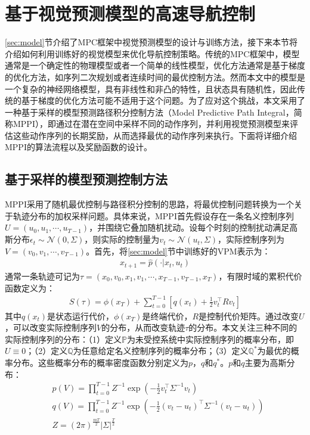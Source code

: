 \section{基于视觉预测模型的高速导航控制}
\ref{sec:model}节介绍了MPC框架中视觉预测模型的设计与训练方法，接下来本节将介绍如何利用训练好的视觉模型来优化导航控制策略。传统的MPC框架中，模型通常是一个确定性的物理模型或者一个简单的线性模型，优化方法通常是基于梯度的优化方法，如序列二次规划或者连续时间的最优控制方法。然而本文中的模型是一个复杂的神经网络模型，具有非线性和非凸的特性，且状态具有随机性，因此传统的基于梯度的优化方法可能不适用于这个问题。为了应对这个挑战，本文采用了一种基于采样的模型预测路径积分控制方法（Model Predictive Path Integral，简称MPPI）\cite{williams2017information, williams2018information}，即通过在潜在空间中采样不同的动作序列，并利用视觉预测模型来评估这些动作序列的长期奖励，从而选择最优的动作序列来执行。下面将详细介绍MPPI的算法流程以及奖励函数的设计。

\subsection{基于采样的模型预测控制方法}
MPPI采用了随机最优控制与路径积分控制的思路，将最优控制问题转换为一个关于轨迹分布的加权采样问题。具体来说，MPPI首先假设存在一条名义控制序列$U  = (u_0, u_1, \cdots, u_{T-1})$，并围绕它叠加随机扰动。设每个时刻的控制扰动满足高斯分布$\epsilon_t \sim \mathcal{N}(0, \Sigma)$，则实际的控制量为$v_t\sim \mathcal{N}(u_t, \Sigma)$，实际控制序列为$V=(v_0, v_1, \cdots, v_{T-1})$。首先，将\ref{sec:model}节中训练好的VPM表示为：
\begin{equation}
\begin{aligned}
    x_{t+1} = \hat{p}(\cdot\vert x_t, u_t)
\end{aligned}
\end{equation}
通常一条轨迹可记为$\tau=(x_0, v_0, x_1, v_1, \cdots, x_{T-1}, v_{T-1}, x_{T})$，有限时域的累积代价函数定义为：
\begin{equation}
\begin{aligned}
    S(\tau) = \phi(x_{T}) + \sum_{t=0}^{T-1} \left[q(x_{t})+\frac{1}{2}v_t^\top R v_t\right]
\end{aligned}
\end{equation}
其中$q(x_t)$是状态运行代价，$\phi(x_T)$是终端代价，$R$是控制代价矩阵。通过改变$U$，可以改变实际控制序列$V$的分布，从而改变轨迹$\tau$的分布。本文关注三种不同的实际控制序列的分布：（1）定义$\mathbb{P}$为未受控系统中实际控制序列的概率分布，即$U\equiv 0$；（2）定义$\mathbb{Q}$为任意给定名义控制序列的概率分布；（3）定义$\mathbb{Q}^*$为最优的概率分布。这些概率分布的概率密度函数分别定义为$p$，$q$和$q^*$。$p$和$q$主要为高斯分布：
\begin{equation}
\begin{aligned}
    &p(V) = \prod_{t=0}^{T-1} Z^{-1} \exp\left(-\frac{1}{2}v_t^\top \Sigma^{-1} v_t\right) \\
    &q(V) = \prod_{t=0}^{T-1} Z^{-1} \exp\left(-\frac{1}{2}(v_t-u_t)^\top \Sigma^{-1} (v_t-u_t)\right) \\
    &Z = (2\pi)^{\frac{mT}{2}} \vert \Sigma \vert^{\frac{T}{2}}
\end{aligned}\label{equ:distribution}
\end{equation}

